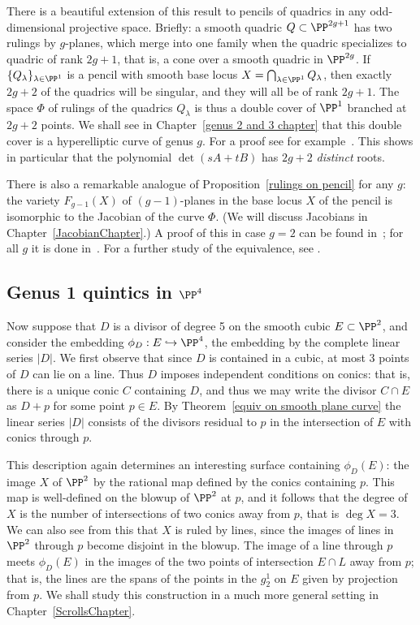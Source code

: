 \begin{fact}
There is a beautiful extension of this result to pencils of quadrics
in any odd-dimensional projective space. Briefly: a smooth quadric $Q
\subset \PP^{2g+1}$ has two rulings by $g$-planes, which merge into
one family when the quadric specializes to quadric of rank $2g+1$,
that is, a cone over a smooth quadric in $\PP^{2g}$. If
$\{Q_\lambda\}_{\lambda \in \PP^1}$ is a pencil with smooth base locus
$X = \bigcap_{\lambda \in \PP^1} Q_\lambda$, then exactly $2g+2$ of
the quadrics will be singular, and they will all be of rank $2g+1$.
The space $\Phi$ of rulings of the quadrics $Q_\lambda$ is thus a
double cover of $\PP^1$ branched at $2g+2$  points. We shall see in
Chapter~\ref{genus 2 and 3 chapter} that this double cover is a
hyperelliptic curve of genus $g$. For a proof see for
example~\cite[Proposition 22.34]{Harris1995}.
 This shows in particular that the polynomial $\det(sA+tB)$ has $2g+2$ \emph{distinct} roots. 

 There is also a remarkable analogue of Proposition~\ref{rulings on pencil} for any $g$: the variety $F_{g-1}(X)$ of $(g-1)$-planes in the base locus $X$ of the pencil is isomorphic to the Jacobian of the  curve $\Phi$. (We will discuss Jacobians in Chapter~\ref{JacobianChapter}.) A proof of this in case $g=2$ can be found in~\cite{Griffiths-Harris1978}; for all $g$ it is done in~\cite{Donagi}. For a further study of the equivalence, see \cite{Eisenbud-Schreyer}.
\end{fact}

\subsection{Genus 1 quintics in $\PP^4$} \label{g=1 in P4}\label{Genus 1 quintics in P4}

Now suppose that $D$ is a divisor of degree 5 on the smooth cubic $E\subset \PP^2$, and consider the embedding 
$\phi_D : E \hookrightarrow  \PP^4$, the embedding by the complete linear series $|D|$. We first observe that since $D$ is
contained in a cubic, at most 3 points of $D$ can lie on a line. Thus $D$ imposes independent conditions on conics: that is, there is a unique conic $C$ containing $D$,
and thus we may write the divisor $C\cap E$ as $D+p$ for some point $p\in E$. By Theorem~\ref{equiv on smooth plane curve} 
the linear series $|D|$ consists of the divisors residual to $p$ in the intersection of $E$ with conics through $p$.

This description again determines an interesting surface containing $\phi_D(E)$: the image $X$ of $\PP^2$ by the rational map
defined by the conics containing $p$. This map is well-defined on the blowup of $\PP^2$ at $p$, and it follows that the degree of $X$ is the number of intersections of two conics away from $p$, that is $\deg X = 3$. We can also see from this that $X$ is ruled by lines, since the images of lines in $\PP^2$ through $p$ become disjoint in the blowup. The image of a line through $p$ meets
$\phi_D(E)$ in the images of the two points of intersection $E\cap L$ away from $p$; that is, the lines are the spans of the
points in the $g^1_2$ on $E$ given by projection from $p$. We shall study this construction in a much more general setting
in Chapter~\ref{ScrollsChapter}.

